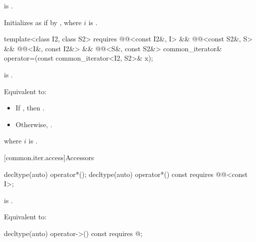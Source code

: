 \begin{itemdescr}
\pnum
\expects
{} is .

\pnum
\effects
Initializes  as if by
,
where $i$ is .
\end{itemdescr}

%
\begin{itemdecl}
template<class I2, class S2>
  requires @@<const I2&, I> && @@<const S2&, S> &&
           @@<I&, const I2&> && @@<S&, const S2&>
    common_iterator& operator=(const common_iterator<I2, S2>& x);
\end{itemdecl}

\begin{itemdescr}
\pnum
\expects
{} is .

\pnum
\effects
Equivalent to:
\begin{itemize}
\item If , then
.

\item Otherwise, .
\end{itemize}
where $i$ is .

\pnum
\returns
{}
\end{itemdescr}

[common.iter.access]{Accessors}

%
\begin{itemdecl}
decltype(auto) operator*();
decltype(auto) operator*() const
  requires @@<const I>;
\end{itemdecl}

\begin{itemdescr}
\pnum
\expects
{} is .

\pnum
\effects
Equivalent to: 
\end{itemdescr}

%
\begin{itemdecl}
decltype(auto) operator->() const
  requires @\seebelow@;
\end{itemdecl}


